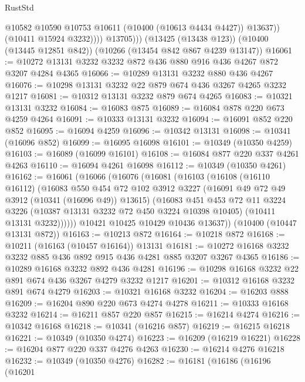 \begin{lexlean}{RustStd}
\begin{coremodule}
{\begin{coremodule}
{{{{{{{{{{{{{{{{{{{{{{{{{                    @10582
                    @10590
                    @10753
                    @10611
                    (@10400 (@10613 @4434 @4427))
                    @13637))
                (@10411 @15924 @3232))))
          @13705)))
    (@13425 (@13438 @123))
    (@10400 (@13445 @12851 @842))
    (@10266 (@13454 @842 @867 @4239 @13147))
@16061 := @10272 @13131 @3232 @3232 @872 @436 @880 @916 @436 @4267 @872 @3207 @4284 @4365
@16066 := @10289 @13131 @3232 @880 @436 @4267
@16076 := @10298 @13131 @3232 @22 @879 @674 @436 @3267 @4265 @3232 @1217
@16081 := @10312 @13131 @3232 @879 @674 @4265
@16083 := @10321 @13131 @3232
@16084 := @16083 @875
@16089 := @16084 @878 @220 @673 @4259 @4264
@16091 := @10333 @13131 @3232
@16094 := @16091 @852 @220 @852
@16095 := @16094 @4259
@16096 := @10342 @13131
@16098 := @10341 (@16096 @852)
@16099 := @16095 @16098
@16101 := @10349 (@10350 @4259)
@16103 := @16089 (@16099 @16101)
@16108 := @16084 @877 @220 @337 @4261 @4263
@16110 := @16094 @4261 @16098
@16112 := @10349 (@10350 @4261)
@16162 := @16061
    (@16066
      (@16076
        (@16081
          (@16103
            (@16108
              (@16110 @16112)
              (@16083
                @550
                @454
                @72
                @102
                @3912
                @3227
                (@16091 @49 @72 @49 @3912 (@10341 (@16096 @49)) @13615)
                (@16083
                  @451
                  @453
                  @72
                  @11
                  @3224
                  @3226
                  (@10387 @13131 @3232 @72 @450 @3224 @10398 @10405)
                  (@10411 @13131 @3232))))))
        @10421
        @10425
        @10429
        @10436
        @13637))
    (@10400 (@10447 @13131 @872))
@16163 := @10213 @872
@16164 := @10218 @872
@16168 := @10211 (@16163 (@10457 @16164)) @13131
@16181 := @10272 @16168 @3232 @3232 @885 @436 @892 @915 @436 @4281 @885 @3207 @3267 @4365
@16186 := @10289 @16168 @3232 @892 @436 @4281
@16196 := @10298 @16168 @3232 @22 @891 @674 @436 @3267 @4279 @3232 @1217
@16201 := @10312 @16168 @3232 @891 @674 @4279
@16203 := @10321 @16168 @3232
@16204 := @16203 @888
@16209 := @16204 @890 @220 @673 @4274 @4278
@16211 := @10333 @16168 @3232
@16214 := @16211 @857 @220 @857
@16215 := @16214 @4274
@16216 := @10342 @16168
@16218 := @10341 (@16216 @857)
@16219 := @16215 @16218
@16221 := @10349 (@10350 @4274)
@16223 := @16209 (@16219 @16221)
@16228 := @16204 @877 @220 @337 @4276 @4263
@16230 := @16214 @4276 @16218
@16232 := @10349 (@10350 @4276)
@16282 := @16181
    (@16186
      (@16196
        (@16201
}}}}}}}}}}}}}}}}}}}}}}}}}
\end{coremodule}}
\end{coremodule}
\end{lexlean}
